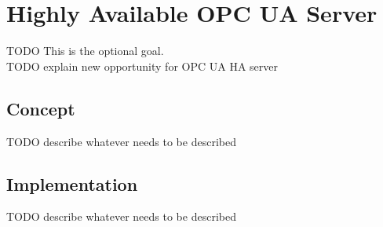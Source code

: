 \chapter{Highly Available OPC UA Server}\label{ch:opc-ua-server}
TODO This is the optional goal.\\
TODO explain new opportunity for OPC UA HA server

\section{Concept}
TODO describe whatever needs to be described

\section{Implementation}
TODO describe whatever needs to be described
